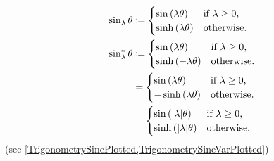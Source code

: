 \documentclass[../methodology.tex]{subfiles}
\begin{document}
\begin{example}\label{M:Trigonometry:Sine}
    \begin{align*}
        \sin_\lambda{\theta}
         & \coloneqq
        \begin{cases}
            \sin\left(\lambda\theta\right)  & \text{if \(\lambda\geq0\),} \\
            \sinh\left(\lambda\theta\right) & \text{otherwise.}           \\
        \end{cases}           \\
        \sin_\lambda^\ast{\theta}
         & \coloneqq
        \begin{cases}
            \sin\left(\lambda\theta\right)   & \text{if \(\lambda\geq0\),} \\
            \sinh\left(-\lambda\theta\right) & \text{otherwise.}           \\
        \end{cases}          \\
         & =
        \begin{cases}
            \sin\left(\lambda\theta\right)   & \text{if \(\lambda\geq0\),} \\
            -\sinh\left(\lambda\theta\right) & \text{otherwise.}           \\
        \end{cases}          \\
         & =\begin{cases}
                \sin\left(\lvert\lambda\rvert\theta\right)  & \text{if \(\lambda\geq0\),} \\
                \sinh\left(\lvert\lambda\rvert\theta\right) & \text{otherwise.}           \\
            \end{cases}
    \end{align*}
    (see \cref{TrigonometrySinePlotted,TrigonometrySineVarPlotted})
\end{example}
\end{document}
